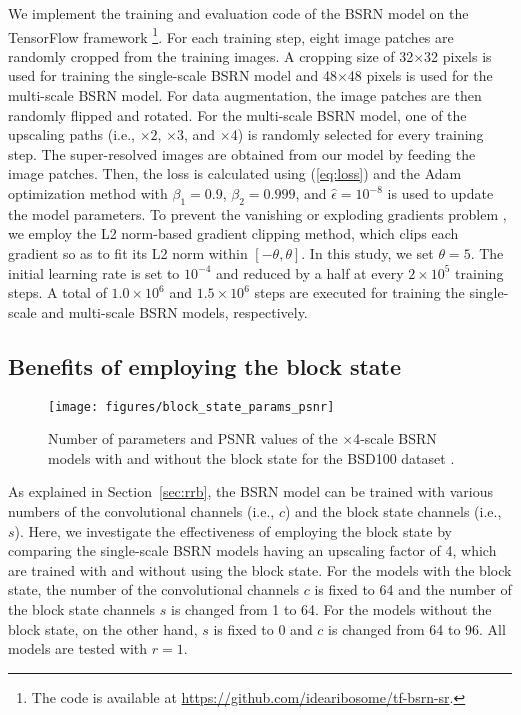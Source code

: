 \documentclass[runningheads]{llncs}
\begin{document}
We implement the training and evaluation code of the BSRN model on the TensorFlow framework \cite{abadi2016tensorflow}\footnote{The code is available at \url{https://github.com/idearibosome/tf-bsrn-sr}.}.
For each training step, eight image patches are randomly cropped from the training images.
A cropping size of 32$\times$32 pixels is used for training the single-scale BSRN model and 48$\times$48 pixels is used for the multi-scale BSRN model.
For data augmentation, the image patches are then randomly flipped and rotated.
For the multi-scale BSRN model, one of the upscaling paths (i.e., $\times2$, $\times3$, and $\times4$) is randomly selected for every training step.
The super-resolved images are obtained from our model by feeding the image patches.
Then, the loss is calculated using (\ref{eq:loss}) and the Adam optimization method \cite{kingma2014adam} with $\beta_{1}=0.9$, $\beta_{2}=0.999$, and $\hat{\epsilon}={10}^{-8}$ is used to update the model parameters.
To prevent the vanishing or exploding gradients problem \cite{bengio1994learning}, we employ the L2 norm-based gradient clipping method, which clips each gradient so as to fit its L2 norm within $[-\theta, \theta]$.
In this study, we set $\theta=5$.
The initial learning rate is set to ${10}^{-4}$ and reduced by a half at every ${2}\times{10}^{5}$ training steps.
A total of ${1.0}\times{10}^{6}$ and ${1.5}\times{10}^{6}$ steps are executed for training the single-scale and multi-scale BSRN models, respectively.


\subsection{Benefits of employing the block state}
\label{sec:block_state_benefits}

\begin{figure}[t!]
	\begin{center}
		\centering
		\texttt{[image: figures/block\_state\_params\_psnr]}
	\end{center}
	\caption{Number of parameters and PSNR values of the $\times$4-scale BSRN models with and without the block state for the BSD100 dataset \cite{martin2001database}.}
	\label{fig:block_state_params_psnr}
\end{figure}

As explained in Section~\ref{sec:rrb}, the BSRN model can be trained with various numbers of the convolutional channels (i.e., $c$) and the block state channels (i.e., $s$).
Here, we investigate the effectiveness of employing the block state by comparing the single-scale BSRN models having an upscaling factor of 4, which are trained with and without using the block state.
For the models with the block state, the number of the convolutional channels $c$ is fixed to 64 and the number of the block state channels $s$ is changed from 1 to 64.
For the models without the block state, on the other hand, $s$ is fixed to 0 and $c$ is changed from 64 to 96.
All models are tested with $r=1$.
\end{document}

